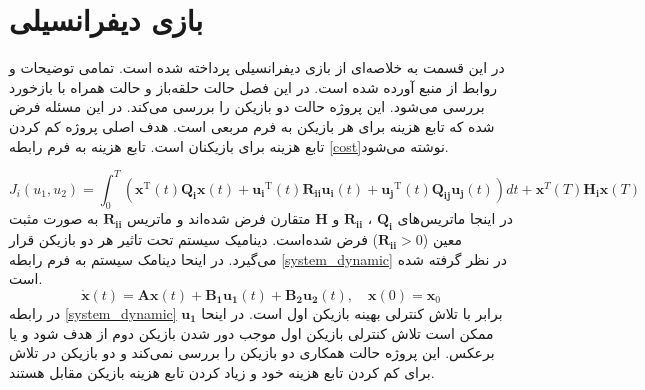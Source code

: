 \chapter{بازی دیفرانسیلی}
در این قسمت به خلاصه‌ای از بازی دیفرانسیلی پرداخته شده است. تمامی توضیحات و روابط  از منبع 
 \cite{article1}
آورده شده است. در این فصل حالت حلقه‌باز
 و حالت همراه با بازخورد بررسی می‌شود.
 این پروژه حالت دو بازیکن را بررسی می‌کند. در این مسئله فرض شده  که تابع هزینه برای هر بازیکن به فرم مربعی است. 	هدف اصلی پروژه کم کردن تابع هزینه برای بازیکنان است. تابع هزینه به فرم رابطه \ref{cost}نوشته می‌شود.

 \begin{equation}\label{cost}
 	J_i(u_1, u_2) = \int_{0}^{T}\left( \boldsymbol{x} ^\mathrm{T}(t) \boldsymbol{Q_i} \boldsymbol{x}(t)+
 	 \boldsymbol{u_i} ^\mathrm{T}(t) \boldsymbol{R_{ii}} \boldsymbol{u_i}(t)+
 	 \boldsymbol{u_j} ^\mathrm{T}(t)\boldsymbol{ Q_{ij} u_j}(t)
 	\right)dt+
 	\boldsymbol{ x} ^T(T)\boldsymbol{ H_i}\boldsymbol{ x}(T) 
  \end{equation}
در اینجا ماتریس‌های 
$\boldsymbol{Q_i}$ ، $\boldsymbol{R_{ii}}$
و
$\boldsymbol{H}$
متقارن فرض شده‌اند و ماتریس 
$\boldsymbol{R_{ii}}$
به صورت مثبت معین ($\boldsymbol{R_{ii}}>0$)
فرض شده‌است.
دینامیک سیستم تحت تاثیر هر دو بازیکن قرار می‌گیرد. در اینحا دینامک سیستم به فرم رابطه \ref{system_dynamic} در نظر گرفته شده ‌است.
\begin{equation}\label{system_dynamic}
	\boldsymbol{\dot x}(t) = \boldsymbol{Ax}(t) + \boldsymbol{B_1u_1}(t) + \boldsymbol{B_2u_2}(t), \quad \boldsymbol{x}(0) = \boldsymbol{x}_0
\end{equation}
در رابطه 
\ref{system_dynamic}
$\boldsymbol{u_1}$
برابر با تلاش کنترلی بهینه بازیکن اول است. در اینحا ممکن است تلاش کنترلی بازیکن اول موجب دور شدن بازیکن دوم از هدف شود و یا برعکس.  این پروژه حالت همکاری دو بازیکن را بررسی نمی‌کند و دو بازیکن در تلاش برای کم کردن تابع هزینه خود و زیاد کردن تابع هزینه بازیکن مقابل هستند.
